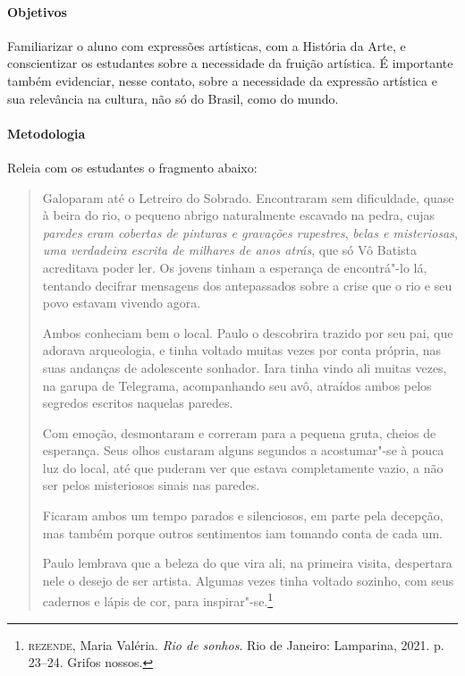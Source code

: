 \documentclass[12pt]{extarticle}
\begin{document}
\paragraph{Objetivos}
Familiarizar o aluno com expressões artísticas, com a História da
Arte, e conscientizar os estudantes sobre a necessidade da fruição
artística. É importante também evidenciar, nesse contato, sobre a
necessidade da expressão artística e sua relevância na cultura, não só
do Brasil, como do mundo.

\paragraph{Metodologia}
Releia com os estudantes o fragmento abaixo:

\begin{quote}
  Galoparam até o Letreiro do Sobrado. Encontraram sem dificuldade,
  quase à beira do rio, o pequeno abrigo naturalmente escavado na pedra,
  cujas \emph{paredes eram cobertas de pinturas e gravações rupestres},
  \emph{belas e misteriosas}, \emph{uma verdadeira escrita de milhares
  de anos atrás}, que só Vô Batista acreditava poder ler. Os jovens
  tinham a esperança de encontrá"-lo lá, tentando decifrar mensagens dos
  antepassados sobre a crise que o rio e seu povo estavam vivendo agora.

  Ambos conheciam bem o local. Paulo o descobrira trazido por seu pai,
  que adorava arqueologia, e tinha voltado muitas vezes por conta
  própria, nas suas andanças de adolescente sonhador. Iara tinha vindo
  ali muitas vezes, na garupa de Telegrama, acompanhando seu avô,
  atraídos ambos pelos segredos escritos naquelas paredes.

  Com emoção, desmontaram e correram para a pequena gruta, cheios de
  esperança. Seus olhos custaram alguns segundos a acostumar"-se à pouca
  luz do local, até que puderam ver que estava completamente vazio, a
  não ser pelos misteriosos sinais nas paredes.

  Ficaram ambos um tempo parados e silenciosos, em parte pela decepção,
  mas também porque outros sentimentos iam tomando conta de cada um.

  Paulo lembrava que a beleza do que vira ali, na primeira visita,
  despertara nele o desejo de ser artista. Algumas vezes tinha voltado
  sozinho, com seus cadernos e lápis de cor, para inspirar"-se.\footnote{\textsc{rezende}, Maria Valéria. \emph{Rio de sonhos}. Rio de Janeiro: Lamparina, 2021. p.\,23--24. Grifos nossos.}
\end{quote}
\end{document}
